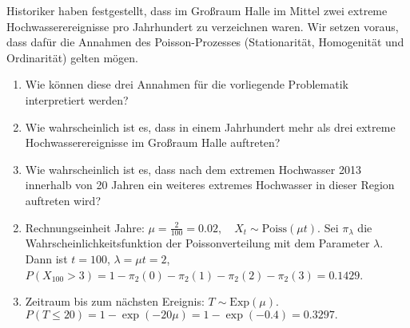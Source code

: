  Historiker haben festgestellt, dass im
Großraum Halle im Mittel zwei extreme Hochwasserereignisse pro Jahrhundert zu
verzeichnen waren. Wir setzen voraus, dass dafür die Annahmen des
Poisson-Prozesses (Stationarität, Homogenität und Ordinarität) gelten mögen.
\begin{enumerate}
    \item Wie können diese drei Annahmen für die vorliegende Problematik interpretiert werden?
        
    \item Wie wahrscheinlich ist es, dass in einem Jahrhundert mehr als drei
        extreme Hochwasserereignisse im Großraum Halle auftreten?
    \item Wie wahrscheinlich ist es, dass nach dem extremen Hochwasser 2013
        innerhalb von 20 Jahren ein weiteres extremes Hochwasser in dieser
        Region auftreten wird?  
\end{enumerate}

\solution
\begin{enumerate}
        \setcounter{enumi}{1}
    \item Rechnungseinheit Jahre: $\mu=\frac{2}{100}=0.02, \quad X_t \sim \text{Poiss}(\mu t).$ 
        Sei $\pi_{\lambda}$ die Wahrscheinlichkeitsfunktion der Poissonverteilung mit dem Parameter $\lambda$. Dann ist
        $t=100$, $\lambda=\mu t=2$, $P(X_{100}>3)=1-\pi_2(0)-\pi_2(1)-\pi_2(2)-\pi_2(3)= 0.1429$.
    \item Zeitraum bis zum nächsten Ereignis: $T \sim \text{Exp}(\mu)$.
        $P(T \le 20)=1-\exp(-20 \mu)=1-\exp(-0.4)=0.3297.$
\end{enumerate}

%        
%
%

